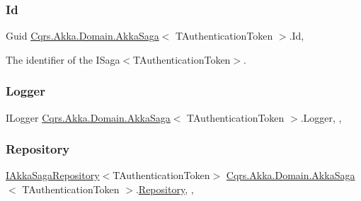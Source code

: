 \subsubsection{\texorpdfstring{Id}{Id}}
{\footnotesize\ttfamily Guid \hyperlink{classCqrs_1_1Akka_1_1Domain_1_1AkkaSaga}{Cqrs.\+Akka.\+Domain.\+Akka\+Saga}$<$ T\+Authentication\+Token $>$.Id\hspace{0.3cm}{\ttfamily [get]}, {}}



The identifier of the I\+Saga$<$\+T\+Authentication\+Token$>$. 

\mbox{\label{classCqrs_1_1Akka_1_1Domain_1_1AkkaSaga_acbb9a6e1cde3e2846270a8fe3f55bc92_acbb9a6e1cde3e2846270a8fe3f55bc92}} 
\subsubsection{\texorpdfstring{Logger}{Logger}}
{\footnotesize\ttfamily I\+Logger \hyperlink{classCqrs_1_1Akka_1_1Domain_1_1AkkaSaga}{Cqrs.\+Akka.\+Domain.\+Akka\+Saga}$<$ T\+Authentication\+Token $>$.Logger\hspace{0.3cm}{\ttfamily [get]}, {\ttfamily [set]}, {\ttfamily [protected]}}

\mbox{\label{classCqrs_1_1Akka_1_1Domain_1_1AkkaSaga_a4c0662a1aa78c8de5fa32c71a54cf393_a4c0662a1aa78c8de5fa32c71a54cf393}} 
\subsubsection{\texorpdfstring{Repository}{Repository}}
{\footnotesize\ttfamily \hyperlink{interfaceCqrs_1_1Akka_1_1Domain_1_1IAkkaSagaRepository}{I\+Akka\+Saga\+Repository}$<$T\+Authentication\+Token$>$ \hyperlink{classCqrs_1_1Akka_1_1Domain_1_1AkkaSaga}{Cqrs.\+Akka.\+Domain.\+Akka\+Saga}$<$ T\+Authentication\+Token $>$.\hyperlink{classCqrs_1_1Domain_1_1Repository}{Repository}\hspace{0.3cm}{\ttfamily [get]}, {\ttfamily [set]}, {\ttfamily [protected]}}

